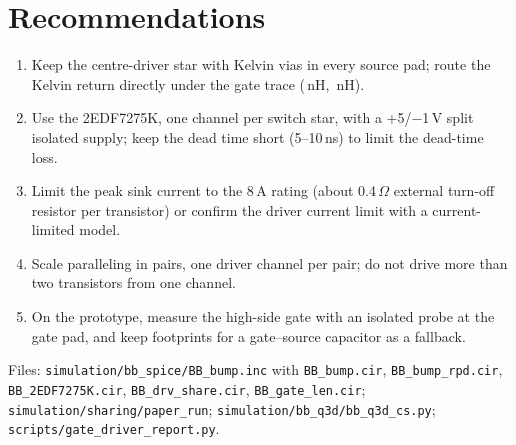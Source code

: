 \documentclass[10pt,a4paper]{article}
\begin{document}
\section{Recommendations}
\begin{enumerate}\itemsep1pt
\item Keep the centre-driver star with Kelvin vias in every source pad; route the Kelvin return directly under the gate trace (\LgateCs\,nH, \LcsKel\,nH).
\item Use the 2EDF7275K, one channel per switch star, with a +5/$-$1\,V split isolated supply; keep the dead time short (5--10\,ns) to limit the dead-time loss.
\item Limit the peak sink current to the 8\,A rating (about 0.4\,$\Omega$ external turn-off resistor per transistor) or confirm the driver current limit with a current-limited model.
\item Scale paralleling in pairs, one driver channel per pair; do not drive more than two transistors from one channel.
\item On the prototype, measure the high-side gate with an isolated probe at the gate pad, and keep footprints for a gate--source capacitor as a fallback.
\end{enumerate}

\noindent\small Files: \texttt{simulation/bb\_spice/BB\_bump.inc} with \texttt{BB\_bump.cir}, \texttt{BB\_bump\_rpd.cir}, \texttt{BB\_2EDF7275K.cir}, \texttt{BB\_drv\_share.cir}, \texttt{BB\_gate\_len.cir}; \texttt{simulation/sharing/paper\_run}; \texttt{simulation/bb\_q3d/bb\_q3d\_cs.py}; \texttt{scripts/gate\_driver\_report.py}.
\end{document}
